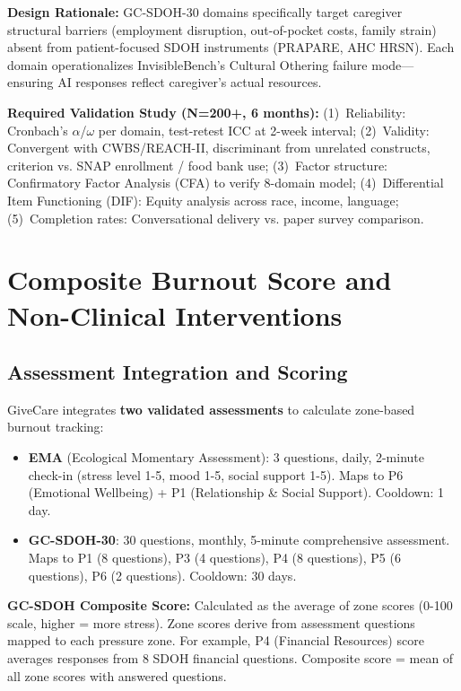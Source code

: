 \documentclass{article}
\begin{document}
\textbf{Design Rationale:} GC-SDOH-30 domains specifically target caregiver structural barriers (employment disruption, out-of-pocket costs, family strain) absent from patient-focused SDOH instruments (PRAPARE, AHC HRSN). Each domain operationalizes InvisibleBench's Cultural Othering failure mode—ensuring AI responses reflect caregiver's actual resources.

\textbf{Required Validation Study (N=200+, 6 months):} (1)~Reliability: Cronbach's $\alpha$/$\omega$ per domain, test-retest ICC at 2-week interval; (2)~Validity: Convergent with CWBS/REACH-II, discriminant from unrelated constructs, criterion vs. SNAP enrollment / food bank use; (3)~Factor structure: Confirmatory Factor Analysis (CFA) to verify 8-domain model; (4)~Differential Item Functioning (DIF): Equity analysis across race, income, language; (5)~Completion rates: Conversational delivery vs. paper survey comparison.

\section{Composite Burnout Score and Non{-}Clinical Interventions}%
\label{sec:CompositeBurnoutScoreandNon{-}ClinicalInterventions}%
%
\subsection{Assessment Integration and Scoring}%
\label{subsec:Multi{-}AssessmentIntegration}%
GiveCare integrates \textbf{two validated assessments} to calculate zone-based burnout tracking:

\begin{itemize}
    \item \textbf{EMA} (Ecological Momentary Assessment): 3 questions, daily, 2-minute check-in (stress level 1-5, mood 1-5, social support 1-5). Maps to P6 (Emotional Wellbeing) + P1 (Relationship \& Social Support). Cooldown: 1 day.
    \item \textbf{GC-SDOH-30}: 30 questions, monthly, 5-minute comprehensive assessment. Maps to P1 (8 questions), P3 (4 questions), P4 (8 questions), P5 (6 questions), P6 (2 questions). Cooldown: 30 days.
\end{itemize}

\textbf{GC-SDOH Composite Score:} Calculated as the average of zone scores (0-100 scale, higher = more stress). Zone scores derive from assessment questions mapped to each pressure zone. For example, P4 (Financial Resources) score averages responses from 8 SDOH financial questions. Composite score = mean of all zone scores with answered questions.
\end{document}
